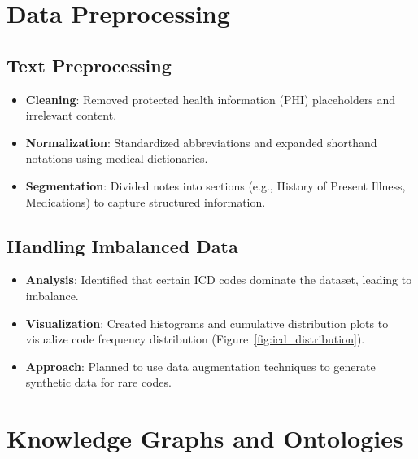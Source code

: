 \documentclass[12pt,a4paper]{report}
\begin{document}
\section{Data Preprocessing}

\subsection{Text Preprocessing}
\begin{itemize}
    \item \textbf{Cleaning}: Removed protected health information (PHI) placeholders and irrelevant content.
    \item \textbf{Normalization}: Standardized abbreviations and expanded shorthand notations using medical dictionaries.
    \item \textbf{Segmentation}: Divided notes into sections (e.g., History of Present Illness, Medications) to capture structured information.
\end{itemize}

\subsection{Handling Imbalanced Data}
\begin{itemize}
    \item \textbf{Analysis}: Identified that certain ICD codes dominate the dataset, leading to imbalance.
    \item \textbf{Visualization}: Created histograms and cumulative distribution plots to visualize code frequency distribution (Figure~\ref{fig:icd_distribution}).
    \item \textbf{Approach}: Planned to use data augmentation techniques to generate synthetic data for rare codes.
\end{itemize}


\section{Knowledge Graphs and Ontologies}
\end{document}
